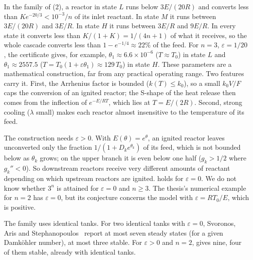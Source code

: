 \documentclass[11pt,a4paper]{report}
\newcommand*{\eps}{\varepsilon}
\begin{document}
\begin{remark}[note={what the states look like}]
In the family of (2), a reactor in state \(L\) runs below \(3E/(20R)\) and converts less than
\(Ke^{-20/3}<10^{-3}/n\) of its inlet reactant. In state \(M\) it runs between \(3E/(20R)\) and \(3E/R\). In state
\(H\) it runs between \(3E/R\) and \(9E/R\). In every state it converts less than \(K/(1+K)=1/(4n+1)\) of what it
receives, so the whole cascade converts less than \(1-e^{-1/4}\approx22\%\) of the feed. For \(n=3\), \(\eps=1/20\),
the certificate gives, for example, \(\theta_1\approx6.6\times10^{-6}\) (\(T\approx T_0\)) in state \(L\) and
\(\theta_1\approx2557.5\) (\(T=T_0(1+\eps\theta_1)\approx129\,T_0\)) in state \(H\). These parameters are a mathematical construction, far
from any practical operating range. Two features carry it. First, the Arrhenius factor is bounded
(\(k(T)\le k_0\)), so a small \(k_0V/F\) caps the conversion of an ignited reactor; the S-shape of the heat release
then comes from the inflection of \(e^{-E/RT}\), which lies at \(T=E/(2R)\). Second, strong cooling (\(\lambda\) small) makes each
reactor almost insensitive to the temperature of its feed.
\end{remark}

\begin{remark}[note={the exponential limit \(\eps=0\)}]
The construction needs \(\eps>0\). With \(E(\theta)=e^\theta\), an ignited reactor leaves unconverted only the
fraction \(1/(1+D_ke^{\theta_k})\) of its feed, which is not bounded below as \(\theta_k\) grows; on the upper branch
it is even below one half (\(g_k>1/2\) where \(g_k''<0\)). So downstream reactors receive very different amounts of
reactant depending on which upstream reactors are ignited.  holds for \(\eps=0\). We do not know whether \(3^n\) is attained for
\(\eps=0\) and \(n\ge3\). The thesis's numerical example for \(n=2\) has \(\eps=0\), but its conjecture concerns the
model with \(\eps=RT_0/E\), which is positive.
\end{remark}

\begin{remark}[note={identical tanks}]
The family uses identical tanks. For two identical tanks with \(\eps=0\), Svoronos, Aris and
Stephanopoulos~\autocite{Svoronos1982} report at most seven steady states (for a given Damköhler number), at most three stable. For \(\eps>0\) and
\(n=2\),  gives nine, four of them stable, already with identical tanks.
\end{remark}
\end{document}
